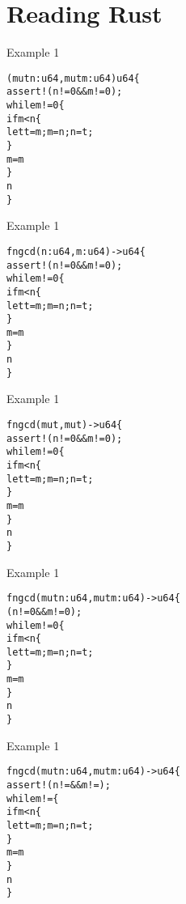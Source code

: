 \section{Reading Rust}


\begin{frame}[fragile]{Example 1}
\begin{alltt}
(mut n: u64, mut m: u64) \hi{->} u64 \{
    assert!(n != 0 && m != 0);
    while m != 0 \{
        if m < n \{
            let t = m; m = n; n = t;
        \}
        m = m % n;
    \}
    n
\}
\end{alltt}
\end{frame}


\begin{frame}[fragile]{Example 1}
\begin{alltt}
fn gcd( n: u64,  m: u64) -> u64 \{
    assert!(n != 0 && m != 0);
    while m != 0 \{
        if m < n \{
            let t = m; m = n; n = t;
        \}
        m = m % n;
    \}
    n
\}
\end{alltt}
\end{frame}


\begin{frame}[fragile]{Example 1}
\begin{alltt}
fn gcd(mut , mut ) -> u64 \{
    assert!(n != 0 && m != 0);
    while m != 0 \{
        if m < n \{
            let t = m; m = n; n = t;
        \}
        m = m % n;
    \}
    n
\}
\end{alltt}
\end{frame}


\begin{frame}[fragile]{Example 1}
\begin{alltt}
fn gcd(mut n: u64, mut m: u64) -> u64 \{
    (n != 0 && m != 0);
    while m != 0 \{
        if m < n \{
            let t = m; m = n; n = t;
        \}
        m = m % n;
    \}
    n
\}
\end{alltt}
\end{frame}


\begin{frame}[fragile]{Example 1}
\begin{alltt}
fn gcd(mut n: u64, mut m: u64) -> u64 \{
    assert!(n !=  && m != );
    while m !=  \{
        if m < n \{
            let t = m; m = n; n = t;
        \}
        m = m % n;
    \}
    n
\}
\end{alltt}
\end{frame}

